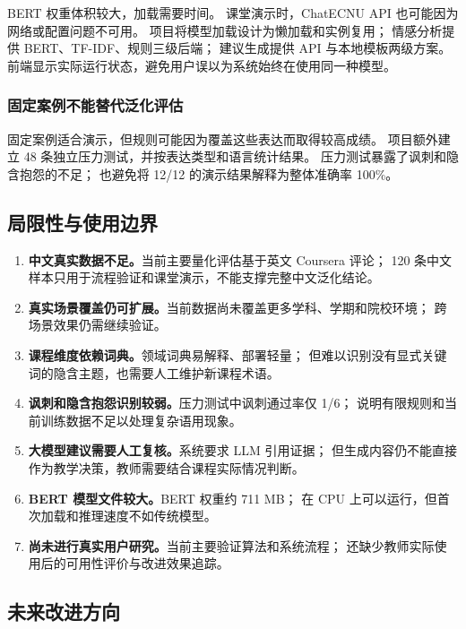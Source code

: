 BERT 权重体积较大，加载需要时间。
课堂演示时，ChatECNU API 也可能因为网络或配置问题不可用。
项目将模型加载设计为懒加载和实例复用；
情感分析提供 BERT、TF-IDF、规则三级后端；
建议生成提供 API 与本地模板两级方案。
前端显示实际运行状态，避免用户误以为系统始终在使用同一种模型。

\subsubsection{固定案例不能替代泛化评估}

固定案例适合演示，但规则可能因为覆盖这些表达而取得较高成绩。
项目额外建立 48 条独立压力测试，并按表达类型和语言统计结果。
压力测试暴露了讽刺和隐含抱怨的不足；
也避免将 12/12 的演示结果解释为整体准确率 100\%。

\subsection{局限性与使用边界}

\begin{enumerate}
  \item \textbf{中文真实数据不足。}当前主要量化评估基于英文 Coursera 评论；
        120 条中文样本只用于流程验证和课堂演示，不能支撑完整中文泛化结论。
  \item \textbf{真实场景覆盖仍可扩展。}当前数据尚未覆盖更多学科、学期和院校环境；
        跨场景效果仍需继续验证。
  \item \textbf{课程维度依赖词典。}领域词典易解释、部署轻量；
        但难以识别没有显式关键词的隐含主题，也需要人工维护新课程术语。
  \item \textbf{讽刺和隐含抱怨识别较弱。}压力测试中讽刺通过率仅 1/6；
        说明有限规则和当前训练数据不足以处理复杂语用现象。
  \item \textbf{大模型建议需要人工复核。}系统要求 LLM 引用证据；
        但生成内容仍不能直接作为教学决策，教师需要结合课程实际情况判断。
  \item \textbf{BERT 模型文件较大。}BERT 权重约 711 MB；
        在 CPU 上可以运行，但首次加载和推理速度不如传统模型。
  \item \textbf{尚未进行真实用户研究。}当前主要验证算法和系统流程；
        还缺少教师实际使用后的可用性评价与改进效果追踪。
\end{enumerate}

\subsection{未来改进方向}

